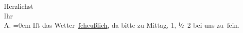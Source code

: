 \pstart
           Herzlichst{\\[\baselineskip]} Ihr{\\[\baselineskip]}\spacefill\mbox{A.}\pend
           \leftskip=0em{}
\pstart
           \noindent{}Iſt das Wetter \uline{ſcheußlich}, da{\geminationn} bitte zu Mittag, 1, ½ 2 bei uns zu ſein.\pend
           \endnumbering{}
\begin{anhang}
\end{anhang}\newcommand{\dateiname}{L04040}\newcommand{\titel}{Arthur Schnitzler an Gustav Schwarzkopf, 12. 4. 1906}\newcommand{\editorInnen}{Herausgegeben von Jahnke, SelmaMüller, Martin Anton}
